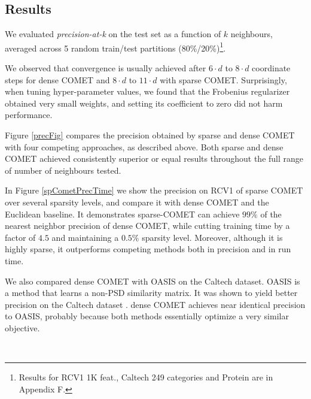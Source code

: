 \documentclass[twoside,11pt]{article}
\newcommand{\ignore}[1]{}
\begin{document}
\subsection{Results}
We evaluated \textit{precision-at-k} on the test set as a function of $k$ neighbours, averaged across 5 random train/test partitions (80\%/20\%)\footnote{Results for RCV1 1K feat., Caltech 249 categories and Protein are in Appendix F.}.
\ignore{Figure \ref{cometConvergeFig} shows the \textit{precision-at-k} over the test sets as it progresses during learning. 
}
We observed that convergence is usually achieved after $6 \cdot d$ to $8 \cdot d$ coordinate steps for dense COMET and $8 \cdot d$ to $11 \cdot d$ with sparse COMET.
Surprisingly, when tuning hyper-parameter values, we found that the Frobenius regularizer obtained very small weights, and setting its coefficient to zero did not harm performance. 

Figure \ref{precFig} compares the precision obtained by sparse and dense COMET with four competing approaches, as described above. Both sparse and dense COMET achieved consistently superior or equal results throughout the full range of number of neighbours tested.

In Figure \ref{spCometPrecTime} we show the precision on RCV1 of sparse COMET over several sparsity levels, and compare it with dense COMET and the Euclidean baseline. It demonstrates sparse-COMET can achieve $99\%$ of the nearest neighbor precision of dense COMET, while cutting training time by a factor of $4.5$ and maintaining a $0.5\%$ sparsity level. Moreover, although it is highly sparse, it outperforms competing methods both in precision and in run time.

We also compared dense COMET with OASIS on the Caltech dataset. OASIS is a method that learns a non-PSD similarity matrix. It was shown to yield better precision on the Caltech dataset \citep{OASIS}. dense COMET achieves near identical precision to OASIS, probably because both methods essentially optimize a very similar objective.


\
\end{document}
